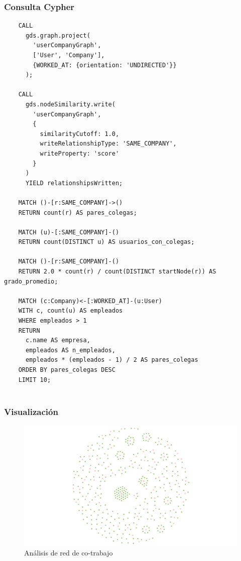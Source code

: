 \documentclass[10pt]{article}
\begin{document}
\subsubsection*{Consulta Cypher}
\begin{center}
	\begin{lstlisting}
    CALL
      gds.graph.project(
        'userCompanyGraph',
        ['User', 'Company'],
        {WORKED_AT: {orientation: 'UNDIRECTED'}}
      );
    
    CALL
      gds.nodeSimilarity.write(
        'userCompanyGraph',
        {
          similarityCutoff: 1.0,
          writeRelationshipType: 'SAME_COMPANY',
          writeProperty: 'score'
        }
      )
      YIELD relationshipsWritten;
    
    MATCH ()-[r:SAME_COMPANY]->()
    RETURN count(r) AS pares_colegas;
    
    MATCH (u)-[:SAME_COMPANY]-()
    RETURN count(DISTINCT u) AS usuarios_con_colegas;
    
    MATCH ()-[r:SAME_COMPANY]-()
    RETURN 2.0 * count(r) / count(DISTINCT startNode(r)) AS grado_promedio;
    
    MATCH (c:Company)<-[:WORKED_AT]-(u:User)
    WITH c, count(u) AS empleados
    WHERE empleados > 1
    RETURN
      c.name AS empresa,
      empleados AS n_empleados,
      empleados * (empleados - 1) / 2 AS pares_colegas
    ORDER BY pares_colegas DESC
    LIMIT 10;
    
    \end{lstlisting}
\end{center}

\subsubsection*{Visualización}
\begin{figure}[H]
	\centering
	\includegraphics[width=1.1\textwidth]{images/similarity.png}
	\caption{Análisis de red de co-trabajo}
\end{figure}
\end{document}
